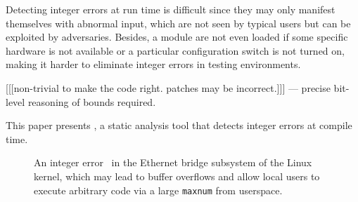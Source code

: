 Detecting integer errors at run time is difficult since they may
only manifest themselves with abnormal input, which are not seen
by typical users but can be exploited by adversaries.  Besides, a
module are not even loaded if some specific hardware is not available
or a particular configuration switch is not turned on, making it
harder to eliminate integer errors in testing environments.

[[[non-trivial to make the code right. patches may be incorrect.]]]
--- precise bit-level reasoning of bounds required.

This paper presents \sys, a static analysis tool that detects integer
errors at compile time.

\begin{figure}

\caption{An integer error~\cite[CVE-2006-5751]{cve} in the Ethernet
bridge subsystem of the Linux kernel, which may lead to buffer
overflows and allow local users to execute arbitrary code via a
large \texttt{maxnum} from userspace.}
\label{f:bridge}
\end{figure}
